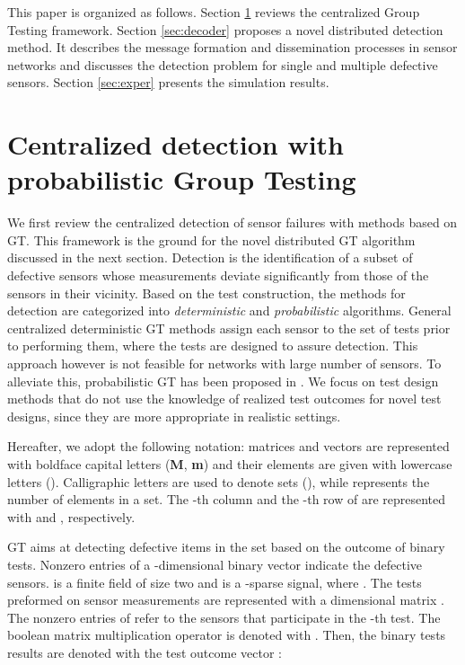 \documentclass[journal]{IEEEtran}
\begin{document}
This paper is organized as follows. Section \ref{sec:centr_det} reviews the centralized Group Testing framework. Section \ref{sec:decoder} proposes a novel distributed detection method. It describes the message formation and dissemination processes in sensor networks and discusses the detection problem for single and multiple defective sensors. Section \ref{sec:exper} presents the simulation results.


\section{Centralized detection with probabilistic Group Testing}\label{sec:centr_det}
We first review the centralized detection of sensor failures with methods based on GT. This framework is the ground for the novel distributed GT algorithm discussed in the next section. Detection is the identification of a subset of defective sensors whose measurements deviate significantly from those of the sensors in their vicinity. Based on the test construction, the methods for detection are categorized into \textit{deterministic} and \textit{probabilistic} algorithms. General centralized deterministic GT methods assign each sensor  to the set of tests prior to performing them, where the tests are designed to  assure detection. This approach however is not feasible for networks with large number of sensors. To alleviate this, probabilistic GT has been proposed in \cite{Cheraghchi:11}. We focus on test design methods that do not use the knowledge of realized test outcomes for novel test designs, since they are more appropriate in realistic settings.
 
Hereafter, we adopt the following notation: matrices and vectors are represented with boldface capital letters (\textbf{M}, \textbf{m}) and their elements are given with lowercase letters (). Calligraphic letters are used to denote sets (), while  represents the number of elements in a set. The -th column and the -th row of  are represented with  and , respectively.
 
GT aims at detecting defective items in the set based on the outcome of binary tests. Nonzero entries of a -dimensional binary vector  indicate the defective sensors.  is a finite field of size two and  is a -sparse signal, where . The tests preformed on sensor measurements are represented with a  dimensional matrix . The nonzero entries of  refer to the sensors that participate in the -th test. The boolean matrix multiplication operator is denoted with . Then, the binary tests results are denoted with the test outcome vector :
 
\end{document}
